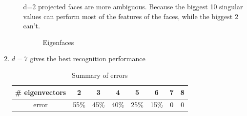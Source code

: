 \documentclass[english,onecolumn]{IEEEtran}
\begin{document}
\begin{enumerate}
\begin{enumerate}
	d=2 projected faces are more ambiguous. Because the biggest 10 singular values can perform most of the features of the faces, while the biggest 2 can't.
	\begin{figure}[h]
	\centering
	\quad
	\quad
	\quad
	\caption{ Eigenfaces}
\end{figure}

	\end{enumerate}
	\item $d=7$ gives the best recognition performance
	\begin{table}[h]
		\centering
		\caption{Summary of errors}
		\begin{tabular}{c|c|c|c|c|c|c|c}
			\# eigenvectors& 2 & 3& 4 & 5 & 6 & 7 & 8 \\ 
			\hline
			error & 55\% & 45\% & 40\% & 25\% & 15\% & 0 & 0  
		\end{tabular}
		\label{tab:my_label}
	\end{table}
	
	
	
	
\end{enumerate}
\end{document}
